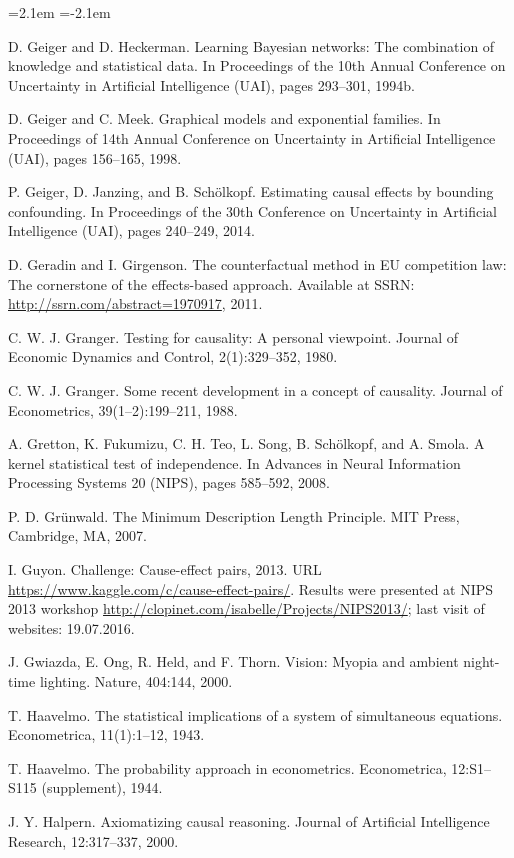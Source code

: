 \begin{list}{}{\leftmargin=2.1em
 \itemindent=-2.1em\parsep=0pt\itemsep=3pt}
\item D. Geiger and D. Heckerman. Learning Bayesian networks: The combination of knowledge and statistical data. In Proceedings of the 10th Annual Conference on Uncertainty in Artificial Intelligence (UAI), pages 293--301, 1994b.
\item D. Geiger and C. Meek. Graphical models and exponential families. In Proceedings of 14th Annual Conference on Uncertainty in Artificial Intelligence (UAI), pages 156--165, 1998.
\item P. Geiger, D. Janzing, and B. Schölkopf. Estimating causal effects by bounding confounding. In Proceedings of the 30th Conference on Uncertainty in Artificial Intelligence (UAI), pages 240--249, 2014.
\item D. Geradin and I. Girgenson. The counterfactual method in EU competition law: The cornerstone of the effects-based approach. Available at SSRN: \url{http://ssrn.com/abstract=1970917}, 2011.
\item C. W. J. Granger. Testing for causality: A personal viewpoint. Journal of Economic Dynamics and Control, 2(1):329--352, 1980.
\item C. W. J. Granger. Some recent development in a concept of causality. Journal of Econometrics, 39(1--2):199--211, 1988.
\item A. Gretton, K. Fukumizu, C. H. Teo, L. Song, B. Schölkopf, and A. Smola. A kernel statistical test of independence. In Advances in Neural Information Processing Systems 20 (NIPS), pages 585--592, 2008.
\item P. D. Grünwald. The Minimum Description Length Principle. MIT Press, Cambridge, MA, 2007.
\item I. Guyon. Challenge: Cause-effect pairs, 2013. URL \url{https://www.kaggle.com/c/cause-effect-pairs/}. Results were presented at NIPS 2013 workshop \url{http://clopinet.com/isabelle/Projects/NIPS2013/}; last visit of websites: 19.07.2016.
\item J. Gwiazda, E. Ong, R. Held, and F. Thorn. Vision: Myopia and ambient night-time lighting. Nature, 404:144, 2000.
\item T. Haavelmo. The statistical implications of a system of simultaneous equations. Econometrica, 11(1):1--12, 1943.
\item T. Haavelmo. The probability approach in econometrics. Econometrica, 12:S1--S115 (supplement), 1944.
\item J. Y. Halpern. Axiomatizing causal reasoning. Journal of Artificial Intelligence Research, 12:317--337, 2000.

\end{list}
